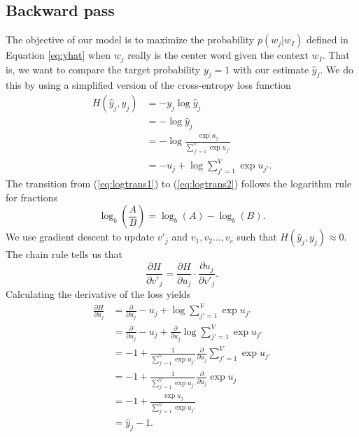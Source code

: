 \documentclass[english]{lni}
\begin{document}
\subsection{Backward pass}
The objective of our model is to maximize the probability $p(w_{j}|w_{I})$ defined in Equation \ref{eq:yhat} when 
$w_{j}$ really is the center word given the context $w_{I}$. That is, we want to compare the target probability $y_{j} = 1$ 
with our estimate $\hat{y}_{j}$. We do this by using a simplified version of the cross-entropy loss function 
\begin{align}
    H(\hat{y}_{j}, y_{j}) &= -y_{j}\log{\hat{y}_{j}} \nonumber \\ 
    &= -\log{\hat{y}_{j}}  \nonumber \\ 
    &= -\log{\frac{\exp{u_{j}}}{\sum_{j'=1}^{V}{\exp{u_{j'}}}}} \label{eq:logtrans1} \\
    &= -u_{j} + \log{\sum_{j'=1}^{V}{\exp{u_{j'}}}} \label{eq:logtrans2}.
\end{align}
The transition from (\ref{eq:logtrans1}) to (\ref{eq:logtrans2}) follows the logarithm rule for fractions
\begin{equation}
    \log_{b}{(\frac{A}{B})} = \log_{b}{(A)} - \log_{b}{(B)}.
\end{equation}
We use gradient descent to update $v'_j$ and $v_{1}, v_{2}\hdots,v_{c}$ such that $H(\hat{y}_{j}, y_{j}) \approx 0$.\\
The chain rule tells us that 
\begin{equation}
    \label{eq:der1}
    \frac{\partial H}{\partial v'_{j}} = \frac{\partial H}{\partial u_{j}}\cdot\frac{\partial u_{j}}{\partial v'_{j}}.
\end{equation}
Calculating the derivative of the loss yields
\begin{align}
    \frac{\partial H}{\partial u_{j}} &= \frac{\partial}{\partial u_{j}}-u_{j} + \log{\sum_{j'=1}^{V}{\exp{u_{j'}}}} \nonumber \\
    &= \frac{\partial}{\partial u_{j}}-u_{j} + \frac{\partial}{\partial u_{j}}\log{\sum_{j'=1}^{V}{\exp{u_{j'}}}} \nonumber \\
    &= -1 + \frac{1}{\sum_{j'=1}^{V}{\exp{u_{j'}}}}\frac{\partial}{\partial u_{j}}\sum_{j'=1}^{V}{\exp{u_{j'}}} \nonumber \\
    &= -1 + \frac{1}{\sum_{j'=1}^{V}{\exp{u_{j'}}}}\frac{\partial}{\partial u_{j}}\exp{u_{j}} \nonumber \\ 
    &= -1 + \frac{\exp{u_{j}}}{\sum_{j'=1}^{V}{\exp{u_{j'}}}} \nonumber \\ 
    &= \hat{y}_{j} - 1.
\end{align}
\end{document}
